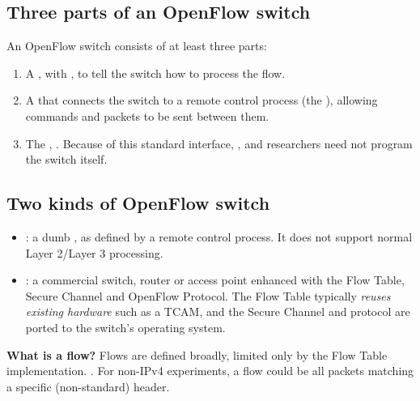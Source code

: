 \subsection{Three parts of an OpenFlow switch}
An OpenFlow switch consists of at least three parts:
\begin{enumerate}
\item A , with , to tell the switch how to process the flow.
\item A  that connects the switch to a remote control process (the ), allowing commands and packets to be sent between them.
\item The , . Because of this standard interface, , and researchers need not program the switch itself.
\end{enumerate}

\subsection{Two kinds of OpenFlow switch}
\begin{itemize}
\item {}: a dumb , as defined by a remote control process. It does not support normal Layer 2/Layer 3 processing.
\item {}: a commercial switch, router or access point enhanced with the Flow Table, Secure Channel and OpenFlow Protocol. The Flow Table typically \emph{reuses existing hardware} such as a TCAM, and the Secure Channel and protocol are ported to the switch's operating system.
\end{itemize}

\textbf{What is a flow?} Flows are defined broadly, limited only by the Flow Table implementation. . For non-IPv4 experiments, a flow could be all packets matching a specific (non-standard) header.

